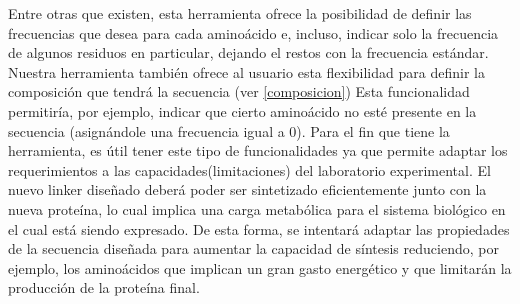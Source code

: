 Entre otras que existen, esta herramienta ofrece la posibilidad de definir las frecuencias que desea para cada aminoácido e, incluso,
indicar solo la frecuencia de algunos residuos en particular, dejando el restos con la frecuencia estándar. 
Nuestra herramienta también ofrece al usuario esta flexibilidad para definir la composición que tendrá la secuencia (ver \ref{composicion})
Esta funcionalidad permitiría, por ejemplo, indicar que cierto aminoácido no esté presente en la secuencia (asignándole una frecuencia igual a 0). 
Para el fin que tiene la herramienta, es útil tener este tipo de funcionalidades ya que permite adaptar los requerimientos a las capacidades(limitaciones) del laboratorio experimental. 
El nuevo linker diseñado deberá poder ser sintetizado eficientemente junto con la nueva proteína, lo cual implica una carga metabólica para el sistema biológico en el cual está siendo expresado. 
De esta forma, se intentará adaptar las propiedades de la secuencia diseñada para aumentar la capacidad de síntesis reduciendo, por ejemplo, los aminoácidos que implican un gran gasto energético
y que limitarán la producción de la proteína final.










